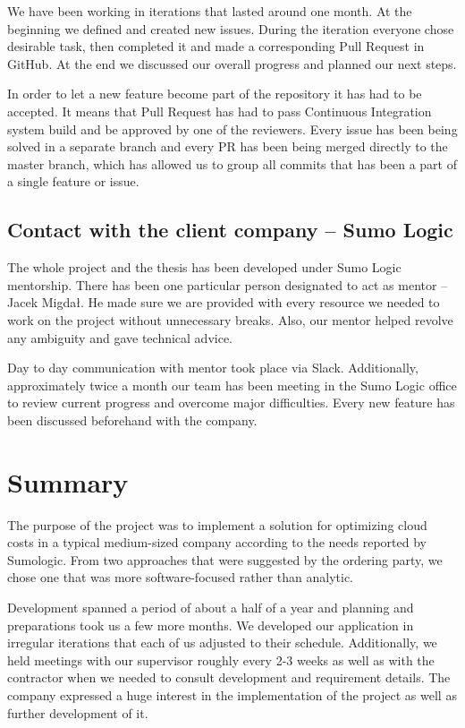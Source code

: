 \documentclass[licencjacka,en]{thesisclass}
\begin{document}
    We have been working in iterations that lasted around one month.
    At the beginning we defined and created new issues.
    During the iteration everyone chose desirable task,
    then completed it and made a corresponding Pull Request in GitHub.
    At the end we discussed our overall progress and planned our next steps.

    In order to let a new feature become part of the repository it has had to be accepted.
    It means that Pull Request has had to pass Continuous Integration
    system build and be approved by one of the reviewers.
    Every issue has been being solved in a separate branch and every PR
    has been being merged directly to the master branch, which has allowed us
    to group all commits that has been a part of a single feature or issue.

    \section{Contact with the client company -- Sumo Logic}

    The whole project and the thesis has been developed under Sumo Logic mentorship.
    There has been one particular person designated to act as mentor -- Jacek Migdał.
    He made sure we are provided with every resource we needed to
    work on the project without unnecessary breaks.
    Also, our mentor helped revolve any ambiguity and gave technical advice.

    Day to day communication with mentor took place via Slack.
    Additionally, approximately twice a month our team has been meeting
    in the Sumo Logic office to review current progress and overcome major difficulties.
    Every new feature has been discussed beforehand with the company.

    \chapter{Summary}
    The purpose of the project was to implement a solution for optimizing cloud costs
    in a typical medium-sized company according to the needs reported by Sumologic.
    From two approaches that were suggested by the ordering party,
    we chose one that was more software-focused rather than analytic.

    Development spanned a period of about a half of a year and planning and preparations took us
    a few more months.
    We developed our application in irregular iterations that each of us adjusted
    to their schedule.
    Additionally, we held meetings with our supervisor roughly every 2-3 weeks
    as well as with the contractor when we needed to consult development and requirement details.
    The company expressed a huge interest in the implementation of the project
    as well as further development of it.
\end{document}
